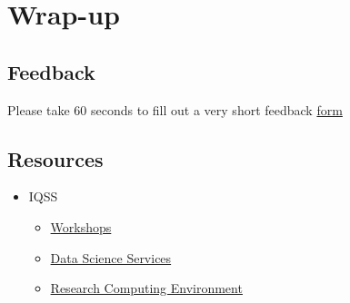 \documentclass[]{book}
\providecommand{\tightlist}{%
  \setlength{\itemsep}{0pt}\setlength{\parskip}{0pt}}
\begin{document}
\section{Wrap-up}\label{wrap-up-6}

\subsection{Feedback}\label{feedback-6}

Please take 60 seconds to fill out a very short feedback
\href{http://bit.ly/training_class_eval}{form}

\subsection{Resources}\label{resources-6}

\begin{itemize}
\tightlist
\item
  IQSS

  \begin{itemize}
  \tightlist
  \item
    \href{https://dss.iq.harvard.edu/workshop-materials}{Workshops}
  \item
    \href{https://dss.iq.harvard.edu/}{Data Science Services}
  \item
    \href{https://iqss.github.io/dss-rce/}{Research Computing
    Environment}
  \end{itemize}
\end{itemize}
\end{document}
